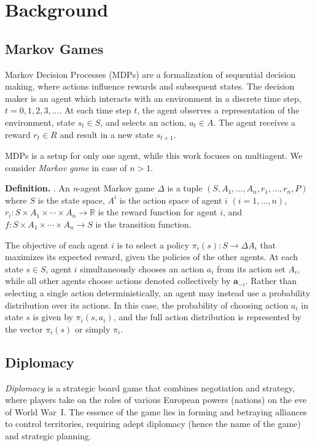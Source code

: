 \documentclass[oneside]{memoir}
\begin{document}
%
%

\chapter{Background}
\label{ch:background}
\section{Markov Games}
Markov Decision Processes (MDPs) are a formalization of sequential decision making, where actions influence rewards and subsequent states. The decision maker is an agent which interacts with an environment in a discrete time step, $t = 0,1,2,3, ...$. At each time step $t$, the agent observes a representation of the environment, state $s_t \in S$, and selects an action, $a_t \in A$. The agent receives a reward $r_t \in R$ and result in a new state $s_{t+1}$. 

MDPs is a setup for only one agent, while this work focuses on multiagent. We consider \textit{Markov game} \citep{Shapley1953StochasticG} in case of $n>1$.

\textbf{Definition.} \citep{bakhtin2023mastering}. An \textit{n}-agent Markov game $\Delta$ is a tuple $(S, A_1, \ldots, A_n, r_1, \ldots, r_n, P)$ where $S$ is the state space, $A^i$ is the action space of agent $i$ $(i = 1, \ldots, n)$, $r_i: S \times A_1 \times \cdots \times A_n \rightarrow \mathbb{R}$ is the reward function for agent $i$, and $f: S \times A_1 \times \cdots \times A_n \rightarrow S$ is the transition function.

The objective of each agent $i$ is to select a policy $\pi_i(s) : S \rightarrow \Delta A_i$ that maximizes its expected reward, given the policies of the other agents. At each state $s \in S$, agent $i$ simultaneously chooses an action $a_i$ from its action set $A_i$, while all other agents choose actions denoted collectively by $\mathbf{a}_{-i}$. Rather than selecting a single action deterministically, an agent may instead use a probability distribution over its actions. In this case, the probability of choosing action $a_i$ in state $s$ is given by $\pi_i(s, a_i)$, and the full action distribution is represented by the vector $\pi_i(s)$ or simply $\pi_i$.

\section{Diplomacy}
\textit{Diplomacy} is a strategic board game that combines negotiation
and strategy, where players take on the roles of various European
powers (nations) on the eve of World War~I.
%
The essence of the game lies in forming and betraying alliances to
control territories, requiring adept diplomacy (hence the name of the game) and strategic planning.
\end{document}
